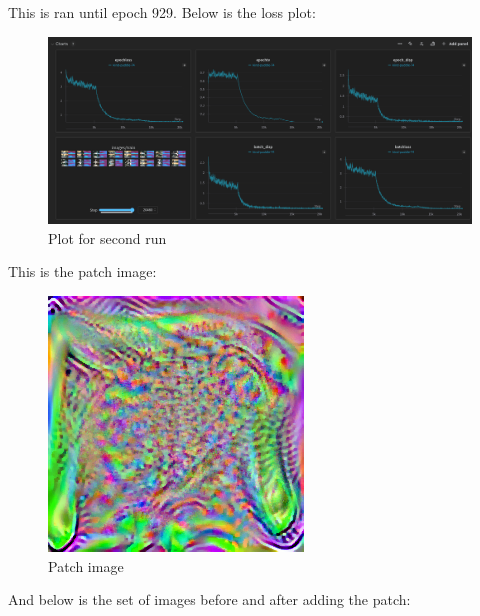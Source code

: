 \documentclass[conference]{IEEEtran}
\begin{document}
This is ran until epoch 929. Below is the loss plot:
\begin{figure}[!h]
    \centering
    \includegraphics[scale=0.15]{./images/results/run2.png}
    \caption{Plot for second run}
  \end{figure} 

This is the patch image:

  \begin{figure}[!h]
    \centering
    \includegraphics[scale=0.5]{./images/results/epoch_929_patch.png}
    \caption{Patch image}
  \end{figure} 

  And below is the set of images before and after adding the patch:
\end{document}
